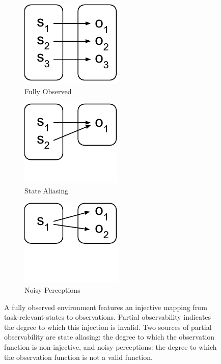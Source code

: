 \documentclass{article} %
\theoremstyle{definition}
\begin{document}
\begin{figure}[htp]
\centering
\begin{subfigure}{.3\textwidth}
  \centering
  \includegraphics[width=.6\linewidth]{figures/bijection}
  \caption{Fully Observed}
  \label{fig:bijection}
\end{subfigure}
\begin{subfigure}{.3\textwidth}
  \centering
  \includegraphics[width=.6\linewidth]{figures/state-aliasing}
  \caption{State Aliasing}
  \label{fig:state-aliasing}
\end{subfigure}
\begin{subfigure}{.3\textwidth}
  \centering
  \includegraphics[width=.6\linewidth]{figures/noisy-perception}
  \caption{Noisy Perceptions}
  \label{fig:noisy-perception}
\end{subfigure}
\caption{A fully observed environment features an injective mapping
  from task-relevant-states to observations. Partial observability
  indicates the degree to which this injection is invalid. Two sources
  of partial observability are state aliasing: the degree to which the
  observation function is non-injective, and noisy perceptions: the
  degree to which the observation function is not a valid function.}
\label{fig:functions}
\end{figure}
\end{document}

